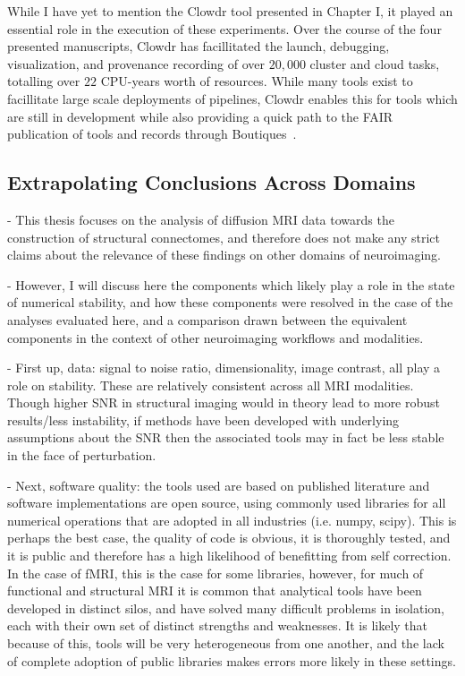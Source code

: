 While I have yet to mention the Clowdr tool presented in Chapter I, it played an essential role in the execution of
these experiments. Over the course of the four presented manuscripts, Clowdr has facillitated the launch, debugging,
visualization, and provenance recording of over $20,000$ cluster and cloud tasks, totalling over $22$ CPU-years
worth of resources. While many tools exist to facillitate large scale deployments of pipelines, Clowdr enables this
for tools which are still in development while also providing a quick path to the FAIR~\cite{wilkinson2016fair}
publication of tools and records through Boutiques~\cite{Glatard2018-tu}.

\subsection{Extrapolating Conclusions Across Domains}
- This thesis focuses on the analysis of diffusion MRI data towards the construction of structural connectomes, and
therefore does not make any strict claims about the relevance of these findings on other domains of neuroimaging.

- However, I will discuss here the components which likely play a role in the state of numerical stability, and how
these components were resolved in the case of the analyses evaluated here, and a comparison drawn between the
equivalent components in the context of other neuroimaging workflows and modalities.

- First up, data: signal to noise ratio, dimensionality, image contrast, all play a role on stability. These are
relatively consistent across all MRI modalities. Though higher SNR in structural imaging would in theory lead to
more robust results/less instability, if methods have been developed with underlying assumptions about the SNR then
the associated tools may in fact be less stable in the face of perturbation.

- Next, software quality: the tools used are based on published literature and software implementations are open
source, using commonly used libraries for all numerical operations that are adopted in all industries (i.e. numpy,
scipy). This is perhaps the best case, the quality of code is obvious, it is thoroughly tested, and it is public
and therefore has a high likelihood of benefitting from self correction. In the case of fMRI, this is the case for
some libraries, however, for much of functional and structural MRI it is common that analytical tools have been
developed in distinct silos, and have solved many difficult problems in isolation, each with their own set of
distinct strengths and weaknesses. It is likely that because of this, tools will be very heterogeneous from one
another, and the lack of complete adoption of public libraries makes errors more likely in these settings.

